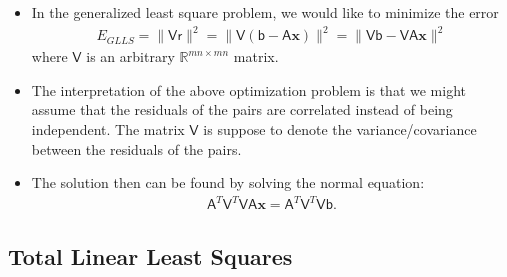 \documentclass[10pt]{article}
\newcommand{\ve}[1]{\mathbf{#1}}
\newcommand{\msf}[1]{\mathsf{#1}}
\begin{document}
  \begin{itemize}
    \item In the generalized least square problem, we would like to 
      minimize the error
      \begin{align*}
        E_{GLLS} 
        = \| \msf{V} \msf{r} \|^2
        = \| \msf{V} (\msf{b} - \msf{A} \ve{x} ) \|^2 
        = \| \msf{V} \msf{b} - \msf{V} \msf{A} \ve{x} \|^2 
      \end{align*}
      where $\msf{V}$ is an arbitrary $\mathbb{R}^{mn \times mn}$
      matrix.
      
    \item The interpretation of the above optimization problem is
      that we might assume that the residuals of the pairs are 
      correlated instead of being independent. The matrix
      $\msf{V}$ is suppose to denote the variance/covariance 
      between the residuals of the pairs.
            
    \item The solution then can be found by solving the normal equation:
      \begin{align*}
        \msf{A}^T \msf{V}^T \msf{V} \msf{A} \ve{x} 
        = \msf{A}^T \msf{V}^T \msf{V} \msf{b}.
      \end{align*}
  \end{itemize}
  
  \subsection{Total Linear Least Squares}
  
\end{document}
